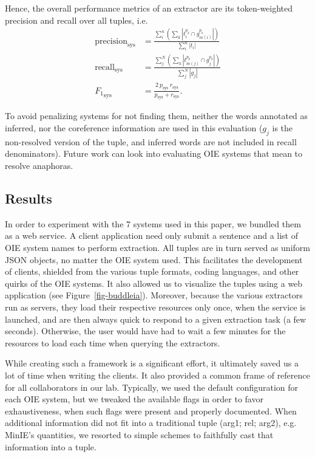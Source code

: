 \pdfoutput=1 \documentclass[11pt, a4paper]{article}
\begin{document}
Hence, the overall performance metrics of an extractor are its token-weighted precision and recall over all tuples, i.e. 
\begin{align*}
\operatorname{precision}_{\text{sys}} & = \frac{{\displaystyle\sum_{i}^n}\left(\sum_k|t_i^{p_k} \cap g_{m(i)}^{p_k}|\right)}{\sum_{i}^n|t_i|}\\
\operatorname{recall}_{\text{sys}} & = \frac{{\displaystyle\sum_{j}^N}\left(\sum_k|t_{m(j)}^{p_k} \cap g_{j}^{p_k}|\right)}{\sum_{j}^N|g_j|}\\
{F_1}_{\text{sys}} & = \frac{2\ p_{\text{sys}}\ r_{\text{sys}}}{p_{\text{sys}}+r_{\text{sys}}}.
\end{align*}

To avoid penalizing systems for not finding them, neither the words annotated
as inferred, nor the coreference information are used in this evaluation (\(g_j\)
is the non-resolved version of the tuple, and inferred words are not included
in recall denominators). Future work can look into evaluating OIE systems that
mean to resolve anaphoras.

\subsection{Results}
\label{sec:orgf4eff85}

In order to experiment with the 7 systems used in this paper, we
bundled them as a web service. A client application
need only submit a sentence and a list of OIE system names to perform
extraction. All tuples are in turn served as uniform JSON objects, no matter the OIE system used. This
facilitates the development of clients, shielded from the
various tuple formats, coding languages,
and other quirks of the OIE systems. It also allowed us to
visualize the tuples using a web application (see
Figure~\ref{fig-buddleia}). Moreover, because the various extractors run as servers,
they load their respective resources only once, when the service is launched, 
and are then always quick to respond to a given extraction task (a few seconds). Otherwise, 
the user would have had to wait a few minutes for the resources to load each time when querying the extractors.

While creating such a framework is a significant
effort, it ultimately saved us a lot of time when writing the clients. It
also provided a common frame of reference for all collaborators in our
lab. Typically, we used the default configuration for each OIE system, but
we tweaked the available flags in order to favor exhaustiveness, when such
flags were present and properly documented. When additional information did
not fit into a traditional tuple (arg1; rel; arg2), e.g. MinIE's
quantities, we resorted to simple schemes to faithfully cast that
information into a tuple.
\end{document}
